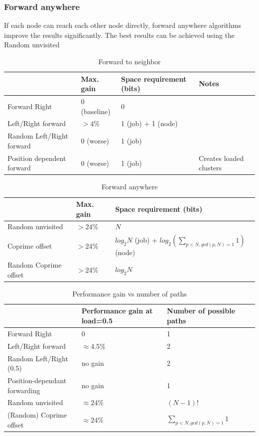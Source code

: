 \documentclass[10pt,a4paper]{article}
\begin{document}
\subsubsection*{Forward anywhere}
If each node can reach each other node directly, forward anywhere algorithms improve the results significantly. The best results can be achieved using the Random unvisited 


\begin{table}[h!]
\centering
\begin{tabular}{|p{}|p{}|p{}|p{}|} \hline
							& Max. gain		& Space requirement (bits)	& Notes \\ \hline
Forward Right				& 0 (baseline)	& 0							&		\\ \hline
Left/Right forward			& $> 4\%$		& 1 (job) + 1 (node)		&		\\ \hline
Random Left/Right forward	& 0 (worse)		& 1 (job)					&		\\ \hline
Position dependent forward	& 0 (worse)		& 1 (job)					& Creates loaded clusters \\ \hline
\end{tabular}
\caption{Forward to neighbor}
\end{table}

\begin{table}[h!]
\centering
\begin{tabular}{|p{}|p{}|p{}|} \hline
							& Max. gain		& Space requirement (bits)	\\ \hline
Random unvisited			& $> 24\%$		& $N$						\\ \hline
Coprime offset				& $> 24\%$		& $log_2 N$ (job) + $log_2 (\sum_{p < N,gcd(p, N) = 1} 1)$ (node) \\ \hline
Random Coprime offset		& $> 24\%$		& $log_2 N$					\\ \hline
\end{tabular}
\caption{Forward anywhere}
\end{table}


\begin{table}
\centering
\begin{tabular}{|p{}|p{}|p{}|p{}|} \hline
 							& Performance gain at load=0.5	& Number of possible paths	\\ \hline
Forward Right				& 0								& 1							\\ \hline
Left/Right forward			& $\approx 4.5\%$				& 2							\\ \hline
Random Left/Right (0.5)		& no gain						& 2							\\ \hline
Position-dependant forwarding & no gain						& 1							\\ \hline
Random unvisited			& $\approx 24\%$						& $(N-1)!$					\\ \hline
(Random) Coprime offset		& $\approx 24\%$						& $\sum_{p < N,gcd(p, N) = 1} 1$ \\ \hline
\end{tabular}
\caption{Performance gain vs number of paths}
\end{table}
\end{document}
